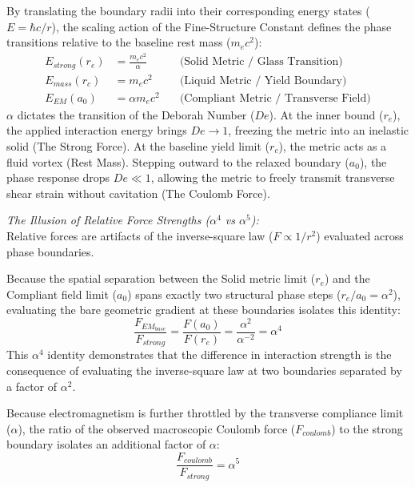 By translating the boundary radii into their corresponding energy states ($E = \hbar c / r$), the scaling action of the Fine-Structure Constant defines the phase transitions relative to the baseline rest mass ($m_e c^2$):
\begin{align}
    E_{strong}(r_e) &= \frac{m_e c^2}{\alpha} \quad &\text{(Solid Metric / Glass Transition)} \\
    E_{mass}(r_c) &= m_e c^2 \quad &\text{(Liquid Metric / Yield Boundary)} \\
    E_{EM}(a_0) &= \alpha m_e c^2 \quad &\text{(Compliant Metric / Transverse Field)}
\end{align}
$\alpha$ dictates the transition of the Deborah Number ($De$). At the inner bound ($r_e$), the applied interaction energy brings $De \to 1$, freezing the metric into an inelastic solid (The Strong Force). At the baseline yield limit ($r_c$), the metric acts as a fluid vortex (Rest Mass). Stepping outward to the relaxed boundary ($a_0$), the phase response drops $De \ll 1$, allowing the metric to freely transmit transverse shear strain without cavitation (The Coulomb Force).

\vspace{0.2 cm}
\textit{The Illusion of Relative Force Strengths ($\alpha^4$ vs $\alpha^5$):} \\
Relative forces are artifacts of the inverse-square law ($F \propto 1/r^2$) evaluated across phase boundaries. 

Because the spatial separation between the Solid metric limit ($r_e$) and the Compliant field limit ($a_0$) spans exactly two structural phase steps ($r_e/a_0 = \alpha^2$), evaluating the bare geometric gradient at these boundaries isolates this identity:
\begin{equation}
    \frac{F_{EM_{base}}}{F_{strong}} = \frac{F(a_0)}{F(r_e)} = \frac{\alpha^2}{\alpha^{-2}} = \alpha^4 \label{eq:force_em_ratio}
\end{equation}
This $\alpha^4$ identity demonstrates that the difference in interaction strength is the consequence of evaluating the inverse-square law at two boundaries separated by a factor of $\alpha^2$.

Because electromagnetism is further throttled by the transverse compliance limit ($\alpha$), the ratio of the observed macroscopic Coulomb force ($F_{coulomb}$) to the strong boundary isolates an additional factor of $\alpha$:
\begin{equation}
    \frac{F_{coulomb}}{F_{strong}} = \alpha^5 \label{eq:force_coulomb_ratio}
\end{equation}

